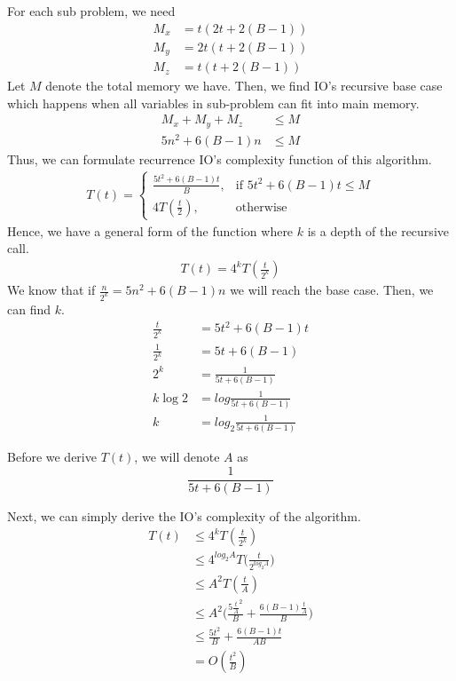For each sub problem, we need
\begin{align*}
	M_x &= t(2t + 2(B-1)) \\
	M_y &= 2t(t+2(B-1))\\
	M_z &= t(t+2(B-1))
\end{align*}
Let $M$ denote the total memory we have. Then, we find IO's recursive base case which happens when all variables in sub-problem can fit into main memory.
\begin{align*}
M_x + M_y + M_z &\leq M \\
5n^2 + 6(B-1)n &\leq M
\end{align*}
Thus, we can formulate recurrence IO's complexity function of this algorithm.
\begin{align*}
	T(t) = \begin{cases}
	    \frac{5t^2 + 6(B-1)t}{B},& \text{if } 5t^2 + 6(B-1)t \leq M\\
	    4T(\frac{t}{2}),              & \text{otherwise}
	\end{cases}
\end{align*}
Hence, we have a general form of the function where $k$ is a depth of the recursive call.
\begin{align*}
	T(t) = 4^{k}T(\frac{t}{2^{k}})
\end{align*}
We know that if $\frac{n}{2^{k}} = 5n^2 + 6(B-1)n$ we will reach the base case. Then, we can find $k$.
\begin{align*}
	\frac{t}{2^k} &= 5t^2 + 6(B-1)t \\
	\frac{1}{2^k	} &= 5t + 6(B-1) \\
	2^k &= \frac{1}{5t + 6(B-1)} \\
	k\log2 &= log\frac{1}{5t + 6(B-1)} \\
	k &= log_2 \frac{1}{5t + 6(B-1)}
\end{align*}

Before we derive $T(t)$, we will denote $A$ as
$$ \frac{1}{5t + 6(B-1)}$$

Next, we can simply derive the IO's complexity of the algorithm.
\begin{align*}
	T(t) &\leq 4^{k}T(\frac{t}{2^{k}}) \\
	&\leq 4^{log_2 A}T\Big(\frac{t}{2^{log_2 A}}\Big) \\
	&\leq A^2T(\frac{t}{A}) \\
	&\leq A^2\Big( \frac{5\frac{t}{A}^2}{B} + \frac{6(B-1)\frac{t}{A}}{B} \Big) \\
	&\leq \frac{5t^2}{B} + \frac{6(B-1)t}{AB} \\
	&= O(\frac{t^2}{B})
\end{align*}

